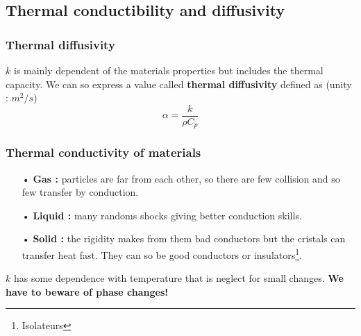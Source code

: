  		\subsection{Thermal conductibility and diffusivity}
			\subsubsection{Thermal diffusivity} 	
	 			$k$ is mainly dependent of the materials properties but includes the thermal capacity. We can so express a value called \textbf{thermal diffusivity} defined as (unity : $m^2/s$)
 				\begin{equation}
 					\alpha = \frac{k}{\rho C_p}
 					\label{eq:3.7}
 				\end{equation}
 			
	 		\subsubsection{Thermal conductivity of materials}
	 			\begin{itemize}
	 				\item[•] \textbf{Gas :} particles are far from each other, so there are few collision and so few transfer by conduction. 
	 				\item[•] \textbf{Liquid :} many randoms shocks giving better conduction skills. 
	 				\item[•] \textbf{Solid :} the rigidity makes from them bad conductors but the cristals can transfer heat fast. They can so be good conductors or insulators\footnote{Isolateurs}. \\
	 			\end{itemize}
	 			
	 			$k$ has some dependence with temperature that is neglect for small changes. \textbf{We have to beware of phase changes!}
	 			
